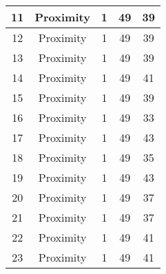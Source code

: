 \documentclass[results.tex]{subfiles}
\begin{document}
\begin{center}
\begin{tabular}{| c || c | c | c | c |}
            \hline
            11                      & Proximity                    & 1                      & 49                      & 39                   \\
            \hline
            12                      & Proximity                    & 1                      & 49                      & 39                   \\
            \hline
            13                      & Proximity                    & 1                      & 49                      & 39                   \\
            \hline
            14                      & Proximity                    & 1                      & 49                      & 41                   \\
            \hline
            15                      & Proximity                    & 1                      & 49                      & 39                   \\
            \hline
            16                      & Proximity                    & 1                      & 49                      & 33                   \\
            \hline
            17                      & Proximity                    & 1                      & 49                      & 43                   \\
            \hline
            18                      & Proximity                    & 1                      & 49                      & 35                   \\
            \hline
            19                      & Proximity                    & 1                      & 49                      & 43                   \\
            \hline
            20                      & Proximity                    & 1                      & 49                      & 37                   \\
            \hline
            21                      & Proximity                    & 1                      & 49                      & 37                   \\
            \hline
            22                      & Proximity                    & 1                      & 49                      & 41                   \\
            \hline
            23                      & Proximity                    & 1                      & 49                      & 41                   \\

\end{tabular}
\end{center}
\end{document}
